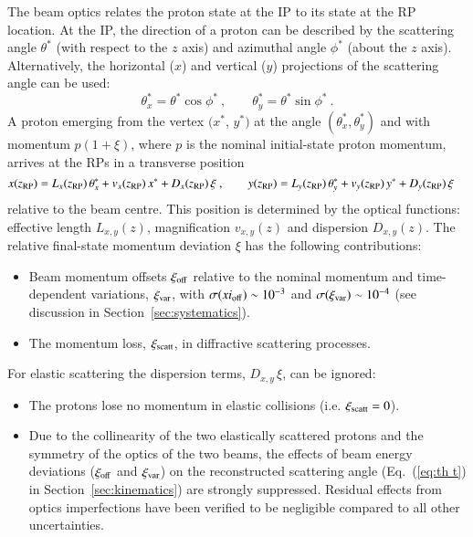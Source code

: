 The beam optics relates the proton state at the IP to its state at the RP location. At the IP, the direction of a proton can be described by the scattering angle $\theta^*$ (with respect to the $z$ axis) and azimuthal angle $\phi^*$ (about the $z$ axis). Alternatively, the horizontal ($x$) and vertical ($y$) projections of the scattering angle can be used:
\begin{equation}
\label{eq:scatt angle}
\theta_x^* = \theta^* \cos\phi^*\ ,\qquad \theta_y^* = \theta^* \sin\phi^*\ .
\end{equation}
A proton emerging from the vertex $(x^*$, $y^*)$ at the angle $(\theta_x^*,\theta_y^*)$ and with momentum  $p (1 +  \xi)$, where $p$ is the nominal initial-state proton momentum, arrives at the RPs in a transverse position
\begin{equation}
\label{eq:prot trans}
	x(z_{\rm RP}) = L_x(z_{\rm RP})\, \theta_x^* + v_x(z_{\rm RP})\, x^* + D_x(z_{\rm RP})\, \xi\ ,\qquad y(z_{\rm RP}) = L_y(z_{\rm RP})\, \theta_y^* + v_y(z_{\rm RP})\, y^* + D_y(z_{\rm RP})\, \xi \quad
\end{equation}
relative to the beam centre. This position is determined by the optical functions: effective length $L_{x,y}(z)$, magnification $v_{x,y}(z)$ and dispersion $D_{x,y}(z)$. 
The relative final-state momentum deviation $\xi$ has the following 
contributions:
\begin{itemize}
\item Beam momentum offsets $\xi_{\rm off}$ relative to the nominal momentum 
and time-dependent variations, $\xi_{\rm var}$, with 
$\sigma(xi_{\rm off}) \sim 10^{-3}$ and $\sigma(\xi_{\rm var}) \sim 10^{-4}$ 
(see discussion in Section~\ref{sec:systematics}).
\item The momentum loss, $\xi_{\rm scatt}$, in diffractive scattering processes.
\end{itemize}
For elastic scattering the dispersion terms, $D_{x,y}\, \xi$, can be ignored: 
\begin{itemize}
\item The protons lose no momentum in elastic collisions 
(i.e. $\xi_{\rm scatt} = 0$).
\item Due to the collinearity of the two elastically scattered protons and 
the symmetry of the optics of the two beams, the effects of 
beam energy deviations ($\xi_{\rm off}$ and $\xi_{\rm var}$) on the 
reconstructed scattering angle (Eq.~(\ref{eq:th t}) in 
Section~\ref{sec:kinematics}) are strongly suppressed. Residual effects from 
optics imperfections have been verified to be negligible compared to all other 
uncertainties.
\end{itemize}


